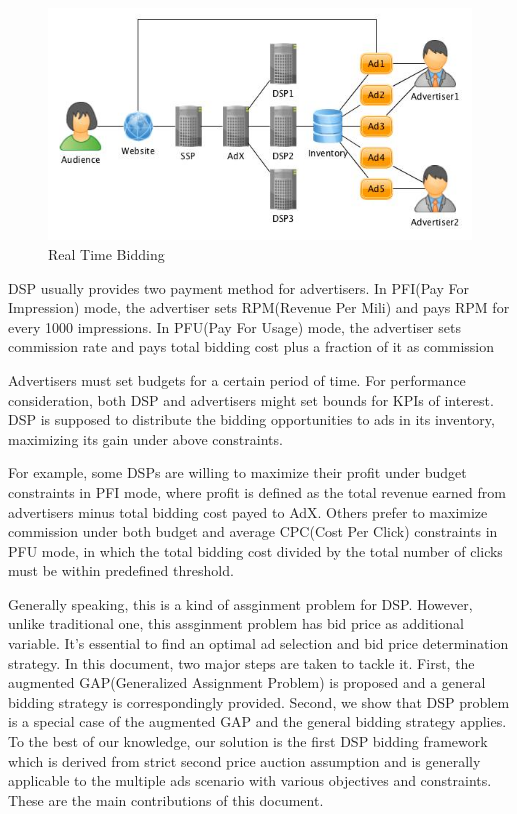 \documentclass[sigconf]{acmart}
\begin{document}
\begin{figure}[!h]
\centering
\includegraphics[width=1.0\linewidth]{./DSP.jpg}
\caption{Real Time Bidding}
\end{figure}

DSP usually provides two payment method for advertisers.
In PFI(Pay For Impression) mode, the advertiser sets RPM(Revenue Per Mili) and pays RPM for every 1000 impressions.
In PFU(Pay For Usage) mode, the advertiser sets commission rate and pays total bidding cost plus a fraction of it as commission

Advertisers must set budgets for a certain period of time.
For performance consideration, both DSP and advertisers might set bounds for KPIs of interest.
DSP is supposed to distribute the bidding opportunities to ads in its inventory, maximizing its gain under above constraints.

For example, some DSPs are willing to maximize their profit under budget constraints in PFI mode,
    where profit is defined as the total revenue earned from advertisers minus total bidding cost payed to AdX.
Others prefer to maximize commission under both budget and average CPC(Cost Per Click) constraints in PFU mode,
    in which the total bidding cost divided by the total number of clicks must be within predefined threshold.

Generally speaking, this is a kind of assginment problem for DSP.
However, unlike traditional one, this assginment problem has bid price as additional variable.
It’s essential to find an optimal ad selection and bid price determination strategy.
In this document, two major steps are taken to tackle it.
First, the augmented GAP(Generalized Assignment Problem) is proposed and a general bidding strategy is correspondingly provided.
Second, we show that DSP problem is a special case of the augmented GAP and the general bidding strategy applies.
To the best of our knowledge, our solution is the first DSP bidding framework
    which is derived from strict second price auction assumption and is generally applicable
    to the multiple ads scenario with various objectives and constraints.
These are the main contributions of this document.
\end{document}
